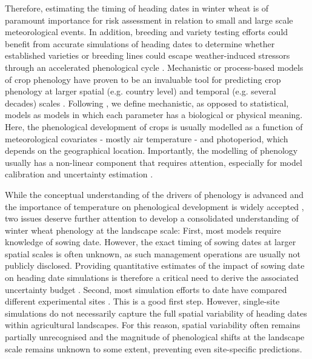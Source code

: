 Therefore, estimating the timing of heading dates in winter wheat is of paramount importance for risk assessment in relation to small and large scale meteorological events. In addition, breeding and variety testing efforts could benefit from accurate simulations of heading dates to determine whether established varieties or breeding lines could escape weather-induced stressors through an accelerated phenological cycle \citep{rogger_can_2021}. Mechanistic or process-based models of crop phenology have proven to be an invaluable tool for predicting crop phenology at larger spatial (e.g. country level) and temporal (e.g. several decades) scales \citep{mcmaster_simulating_1992, wu_comparison_2017, ceglar_improving_2019}. Following \cite{cox_towards_2006}, we define mechanistic, as opposed to statistical, models as models in which each parameter has a biological or physical meaning. Here, the phenological development of crops is usually modelled as a function of meteorological covariates - mostly air temperature - and photoperiod, which depends on the geographical location. Importantly, the modelling of phenology usually has a non-linear component that requires attention, especially for model calibration and uncertainty estimation \citep{kawakita_prediction_2020}.

While the conceptual understanding of the drivers of phenology is advanced \citep{hyles_phenology_2020} and the importance of temperature on phenological development is widely accepted \citep{porter_temperatures_1999}, two issues deserve further attention to develop a consolidated understanding of winter wheat phenology at the landscape scale: First, most models require knowledge of sowing date. However, the exact timing of sowing dates at larger spatial scales is often unknown, as such management operations are usually not publicly disclosed. Providing quantitative estimates of the impact of sowing date on heading date simulations is therefore a critical need to derive the associated uncertainty budget \citep{wu_comparison_2017, dueri_simulation_2022}. Second, most simulation efforts to date have compared different experimental sites \citep[for example]{rogger_can_2021}. This is a good first step. However, single-site simulations do not necessarily capture the full spatial variability of heading dates within agricultural landscapes. For this reason, spatial variability often remains partially unrecognised and the magnitude of phenological shifts at the landscape scale remains unknown to some extent, preventing even site-specific predictions.

